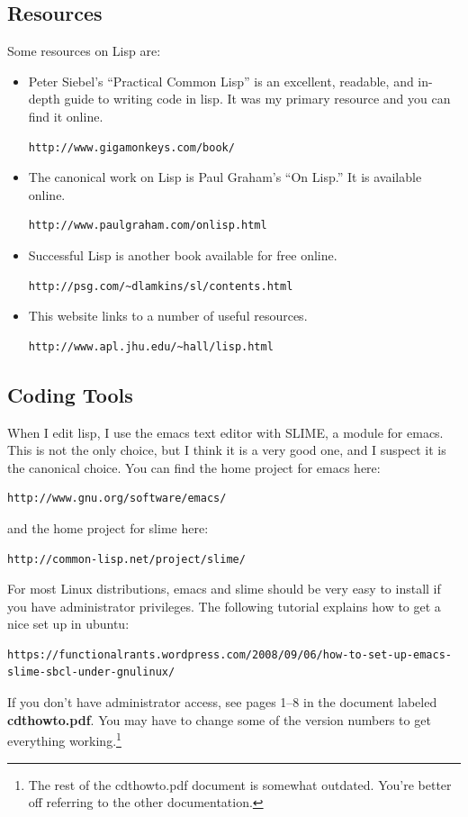 \message{ !name(programmers_guide.tex)}\documentclass[12pt]{article}
\begin{document}
\subsection{Resources}
Some resources on Lisp are:
\begin{itemize}
\item Peter Siebel's ``Practical Common Lisp'' is an excellent,
  readable, and in-depth guide to writing code in lisp. It was my
  primary resource and you can find it online.
  \begin{verbatim}
http://www.gigamonkeys.com/book/
\end{verbatim}
\item The canonical work on Lisp is Paul Graham's ``On Lisp.'' It is available online.
\begin{verbatim}
http://www.paulgraham.com/onlisp.html
\end{verbatim}
\item Successful Lisp is another book available for free online.
\begin{verbatim}
http://psg.com/~dlamkins/sl/contents.html
\end{verbatim}
\item This website links to a number of useful resources.
  \begin{verbatim}
http://www.apl.jhu.edu/~hall/lisp.html
\end{verbatim}
\end{itemize}
\subsection{Coding Tools}
\label{s:lisp:tools}
When I edit lisp, I use the emacs text editor with SLIME, a module for
emacs. This is not the only choice, but I think it is a very good one,
and I suspect it is the canonical choice. You can find the home
project for emacs here:
\begin{verbatim}
http://www.gnu.org/software/emacs/
\end{verbatim}
and the home project for slime here:
\begin{verbatim}
http://common-lisp.net/project/slime/
\end{verbatim}
For most Linux distributions, emacs and slime should be very easy to
install if you have administrator privileges. The following tutorial explains how to get a nice set up in ubuntu:
\begin{footnotesize}
\begin{verbatim}
https://functionalrants.wordpress.com/2008/09/06/how-to-set-up-emacs-slime-sbcl-under-gnulinux/
\end{verbatim}
\end{footnotesize}
If you don't have administrator access, see pages 1--8 in the document
labeled \textbf{cdthowto.pdf}. You may have to change some of the
version numbers to get everything working.\footnote{The rest of the
  cdthowto.pdf document is somewhat outdated. You're better off
  referring to the other documentation.}
\end{document}
